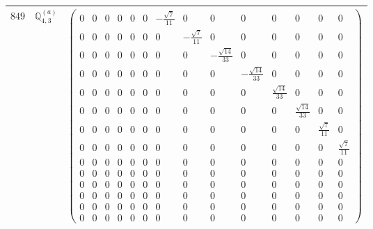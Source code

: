 \documentclass[fleqn,8pt,landscape]{jsarticle}
\begin{document}
\begin{center}
\begin{longtable}{ccc}
$ 849 $ & $ \mathbb{Q}_{4,3}^{(a)} $ & $ \begin{pmatrix} 0 & 0 & 0 & 0 & 0 & 0 & - \frac{\sqrt{7}}{11} & 0 & 0 & 0 & 0 & 0 & 0 & 0 \\ 0 & 0 & 0 & 0 & 0 & 0 & 0 & - \frac{\sqrt{7}}{11} & 0 & 0 & 0 & 0 & 0 & 0 \\ 0 & 0 & 0 & 0 & 0 & 0 & 0 & 0 & - \frac{\sqrt{14}}{33} & 0 & 0 & 0 & 0 & 0 \\ 0 & 0 & 0 & 0 & 0 & 0 & 0 & 0 & 0 & - \frac{\sqrt{14}}{33} & 0 & 0 & 0 & 0 \\ 0 & 0 & 0 & 0 & 0 & 0 & 0 & 0 & 0 & 0 & \frac{\sqrt{14}}{33} & 0 & 0 & 0 \\ 0 & 0 & 0 & 0 & 0 & 0 & 0 & 0 & 0 & 0 & 0 & \frac{\sqrt{14}}{33} & 0 & 0 \\ 0 & 0 & 0 & 0 & 0 & 0 & 0 & 0 & 0 & 0 & 0 & 0 & \frac{\sqrt{7}}{11} & 0 \\ 0 & 0 & 0 & 0 & 0 & 0 & 0 & 0 & 0 & 0 & 0 & 0 & 0 & \frac{\sqrt{7}}{11} \\ 0 & 0 & 0 & 0 & 0 & 0 & 0 & 0 & 0 & 0 & 0 & 0 & 0 & 0 \\ 0 & 0 & 0 & 0 & 0 & 0 & 0 & 0 & 0 & 0 & 0 & 0 & 0 & 0 \\ 0 & 0 & 0 & 0 & 0 & 0 & 0 & 0 & 0 & 0 & 0 & 0 & 0 & 0 \\ 0 & 0 & 0 & 0 & 0 & 0 & 0 & 0 & 0 & 0 & 0 & 0 & 0 & 0 \\ 0 & 0 & 0 & 0 & 0 & 0 & 0 & 0 & 0 & 0 & 0 & 0 & 0 & 0 \\ 0 & 0 & 0 & 0 & 0 & 0 & 0 & 0 & 0 & 0 & 0 & 0 & 0 & 0 \end{pmatrix} $ \\ \hline

\end{longtable}
\end{center}
\end{document}
